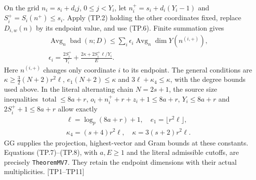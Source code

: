 On the grid $n_i=s_i+d_i j$, $0\le j<Y_i$, let
$n_i^+=s_i+d_i(Y_i-1)$ and $S_i^+=S_i(n^+)\le s_i$.
Apply (TP.2) holding the other coordinates fixed, replace $D_{i,w}(n)$
by its endpoint value, and use (TP.6). Finite summation gives
\[
 \boxed{\begin{gathered}
 \operatorname{Avg}_n\operatorname{bad}(n;D)
 \le\sum_i\epsilon_i\operatorname{Avg}_n\dim Y(n^{(i,+)}),\\
 \epsilon_i=\frac{2S_i^+}{Y_i}
 +\frac{2\kappa+2S_i^+\ell/Y_i}{E}.
 \end{gathered}}
 \tag{TP.7}
\]
Here $n^{(i,+)}$ changes only coordinate $i$ to its endpoint. The general
conditions are
$\kappa\ge\tfrac32(N+2)r^2\ell$, $e_1(N+2)\le\kappa$ and
$3\ell+\kappa_4\le\kappa$, with the degree bounds used above.
In the literal alternating chain $N=2s+1$, the source size inequalities
$\operatorname{total}\le8a+r$,
$o_i+n_i^++r+z_i+1\le8a+r$, $Y_i\le8a+r$ and
$2S_i^++1\le8a+r$ allow exactly
\[
 \begin{gathered}
 \ell=\log_p(8a+r)+1,\quad e_1=\lfloor r^2\ell\rfloor,
 \\\kappa_4=(s+4)r^2\ell,\quad
 \kappa=3(s+2)r^2\ell.
 \end{gathered}
 \tag{TP.8}
\]
GG supplies the projection, highest-vector and Gram bounds at these constants.
Equations (TP.7)--(TP.8), with $a,E\ge1$
and the literal admissible cutoffs, are precisely \texttt{TheoremMV7}.
They retain the endpoint dimensions with their actual multiplicities.
\textup{[TP1--TP11]}
